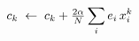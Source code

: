\documentclass[preview]{standalone}
\begin{document}
\begin{align*}
\special{dvisvgm:raw <g id='unique000'>}c_k \;\leftarrow\; c_k + \tfrac{2\alpha}{N}\sum_i e_i\, x_i^k\special{dvisvgm:raw </g>}
\end{align*}
\end{document}
